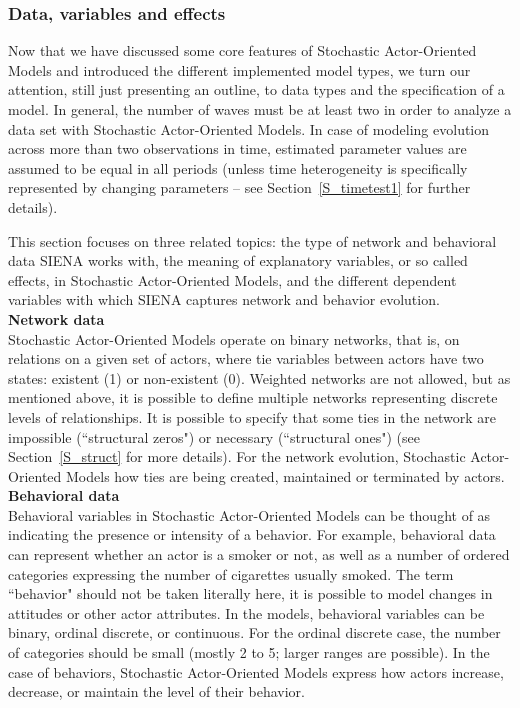 \documentclass[a4paper,fleqn,11pt]{article}
\newcommand{\+}{\, + \,}
\newcommand{\SI}{{\sf SIENA }}
\newcommand{\saom}{{Stochastic Actor-Oriented Model}}
\begin{document}
\subsubsection{Data, variables and effects}
\label{S_datvareff}

Now that we have discussed some core features of {\saom}s and introduced
the different implemented model types,
we turn our attention, still just presenting an outline, to
data types and the specification of a model. In general, the
number of waves must be at least two in order to analyze a
data set with {\saom}s. In case of modeling
 evolution across more than two observations in time, estimated
parameter values are assumed to be equal in all periods (unless time
heterogeneity is specifically represented by changing parameters --
see Section~\ref{S_timetest1} for further details).

This section focuses on three related topics: the type of network and
behavioral data \SI works with, the meaning of explanatory variables,
or so called effects, in {\saom}s, and the
different dependent variables with which \SI captures network and
behavior evolution.\\

\noindent
\textbf{Network data}\\

{\saom}s operate on binary networks,
that is, on relations on a given set of actors,
where tie variables between actors have two states:
existent (1) or non-existent (0).
Weighted networks are not allowed, but as mentioned above, it is
possible to define multiple networks representing discrete levels
of relationships. It is possible to specify that some ties in the
network are impossible (``structural zeros") or necessary (``structural ones")
(see Section~\ref{S_struct} for more details).
For the network evolution, {\saom}s how ties
are being created, maintained or terminated by actors.\\

\noindent
\textbf{Behavioral data}\\

Behavioral variables in {\saom}s can be
thought of as indicating the presence or intensity of a behavior.
For example, behavioral data can represent whether an actor is a
smoker or not, as well as a number of ordered categories
expressing the number of cigarettes usually smoked.
The term ``behavior" should not be taken literally here, it is
possible to model changes in attitudes or other actor attributes.
In the models, behavioral variables can be binary, ordinal discrete,
or continuous. For the ordinal discrete case, the number of categories should be small
(mostly 2 to 5; larger ranges are possible).
In the case of behaviors, {\saom}s express
how actors increase, decrease, or maintain the level of their behavior.\\
\end{document}
